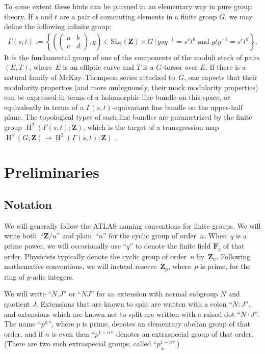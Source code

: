 \documentclass[pdftex]{sigma}
\numberwithin{equation}{section}
\newcommand\bF{\mathbf F}
\newcommand\bZ{\mathbf Z}
\DeclareMathOperator\homology{H}
\renewcommand\H{\homology}
\newcommand\<\langle
\renewcommand\>\rangle
\newcommand{\SL}{\mathrm{SL}}
\begin{document}
To some extent these hints can be pursued in an elementary way in pure group theory.
If $s$ and $t$ are a pair of commuting elements in a finite group $G$, we may define the following infinite group:
\begin{gather*}
\Gamma(s,t) := \left\{\left(
\left(\begin{matrix}
a & b \\ c & d
\end{matrix}
\right), g \right) \in \SL_2(\bZ) \times G\, \bigg| \,gsg^{-1} = s^a t^b \text{ and } gtg^{-1} = s^c t^d
\right\}.
\end{gather*}
It is the fundamental group of one of the components of the moduli stack of pairs $(E,T)$, where~$E$ is an elliptic curve and $T$ is a $G$-torsor over $E$.
If there is a natural family of McKay--Thompson series attached to~$G$, one expects that their modularity properties (and more ambiguously, their mock modularity properties) can be expressed in terms of a holomorphic line bundle on this space, or equivalently in terms of a $\Gamma(s,t)$-equivariant line bundle on the upper-half plane. The topological types of such line bundles are parametrized by the finite group $\H^2(\Gamma(s,t);\bZ)$, which is the target of a transgression map $\H^4(G;\bZ) \to \H^2(\Gamma(s,t);\bZ)$ \cite[Section~2]{MR2500561}.

\section{Preliminaries}

\subsection{{Notation}}\label{subsec:notation}

We will generally follow the ATLAS naming conventions for finite groups. We will write both~``$\bZ/n$'' and plain~``$n$'' for the cyclic group of order~$n$. When~$q$ is a prime power, we will occasionally use ``$q$'' to denote the finite field $\bF_q$ of that order. Physicists typically denote the cyclic group of order~$n$ by~$\bZ_n$. Following mathematics conventions, we will instead reserve~$\bZ_p$, where~$p$ is prime, for the ring of $p$-adic integers.

We will write ``$N.J$'' or ``$NJ$'' for an extension with normal subgroup $N$ and quotient $J$. Extensions that are known to split are written with a colon ``$N:J$'', and extensions which are known not to split are written with a raised dot ``$N \cdot J$''. The name ``$p^n$'', where $p$ is prime, denotes an elementary abelian group of that order, and if $n$ is even then ``$p^{1+n}$'' denotes an extraspecial group of that order. (There are two such extraspecial groups, called ``$p^{1+n}_\pm$''.)
\end{document}
